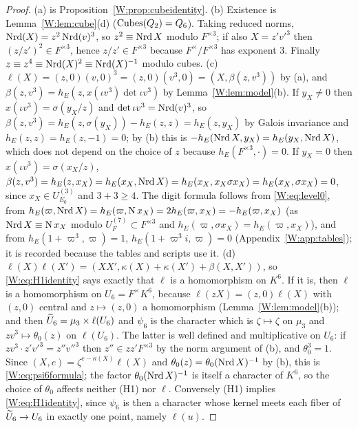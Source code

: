 \begin{proof}
(a) is Proposition~\ref{W:prop:cubeidentity}.  (b) Existence is
Lemma~\ref{W:lem:cube}(d) ($\mathrm{Cubes}(Q_2)=Q_6$).  Taking reduced norms,
$\operatorname{Nrd}(X)=z^2\operatorname{Nrd}(v)^3$, so $z^2\equiv\operatorname{Nrd} X$ modulo $F^{\times3}$; if
also $X=z'v'^3$ then $(z/z')^2\in F^{\times3}$, hence $z/z'\in F^{\times3}$
because $F^\times/F^{\times3}$ has exponent $3$.  Finally
$z\equiv z^4\equiv\operatorname{Nrd}(X)^2\equiv\operatorname{Nrd}(X)^{-1}$ modulo cubes.  (c) $\ell(X)=(z,0)(v,0)^3=(z,0)(v^3,0)=(X,\beta(z,v^3))$
by (a), and $\beta(z,v^3)=h_E(z,x(\iota v^3)\det\iota v^3)$ by
Lemma~\ref{W:lem:model}(b).  If $y_X\ne0$ then $x(\iota v^3)=\sigma(y_X/z)$
and $\det\iota v^3=\operatorname{Nrd}(v)^3$, so
$\beta(z,v^3)=h_E(z,\sigma(y_X))-h_E(z,z)=h_E(z,y_X)$ by Galois
invariance and $h_E(z,z)=h_E(z,-1)=0$; by (b) this is
$-h_E(\operatorname{Nrd} X,y_X)=h_E(y_X,\operatorname{Nrd} X)$, which does not depend on the choice
of $z$ because $h_E(F^{\times3},\cdot)=0$.  If $y_X=0$ then
$x(\iota v^3)=\sigma(x_X/z)$, $\beta(z,v^3)=h_E(z,x_X)=h_E(x_X,\operatorname{Nrd} X)=h_E(x_X,x_X\sigma x_X)=h_E(x_X,\sigma x_X)=0$,
since $x_X\in U^{(3)}_{E_0}$ and $3+3\ge4$.  The digit formula follows
from \eqref{W:eq:level0}, from $h_E(\varpi,\operatorname{Nrd} X)=h_E(\varpi,\operatorname N x_X)=2h_E(\varpi,x_X)=-h_E(\varpi,x_X)$
(as $\operatorname{Nrd} X\equiv\operatorname N x_X$ modulo $U^{(7)}_F\subset F^{\times3}$ and
$h_E(\varpi,\sigma x_X)=h_E(\varpi,x_X)$), and from $h_E(1+\varpi^3,\varpi)=1$,
$h_E(1+\varpi^3i,\varpi)=0$ (Appendix~\ref{W:app:tables}); it is recorded
because the tables and scripts use it.  (d)
$\ell(X)\ell(X')=(XX',\kappa(X)+\kappa(X')+\beta(X,X'))$, so
\eqref{W:eq:H1identity} says exactly that $\ell$ is a homomorphism on
$K^6$.  If it is, then $\ell$ is a homomorphism on $U_6=F^\times K^6$,
because $\ell(zX)=(z,0)\ell(X)$ with $(z,0)$ central and $z\mapsto(z,0)$
a homomorphism (Lemma~\ref{W:lem:model}(b)); and then
$\widetilde U_6=\mu_3\times\ell(U_6)$ and $\psi_6$ is the character which is
$\zeta\mapsto\zeta$ on $\mu_3$ and $zv^3\mapsto\theta_0(z)$ on
$\ell(U_6)$.  The latter is well defined and multiplicative on $U_6$:
if $zv^3\cdot z'v'^3=z''v''^3$ then $z''\in zz'F^{\times3}$ by the norm
argument of (b), and $\theta_0^3=1$.  Since $(X,e)=\zeta^{e-\kappa(X)}\ell(X)$
and $\theta_0(z)=\theta_0(\operatorname{Nrd} X)^{-1}$ by (b), this is
\eqref{W:eq:psi6formula}; the factor $\theta_0(\operatorname{Nrd} X)^{-1}$ is itself a
character of $K^6$, so the choice of $\theta_0$ affects neither (H1) nor
$\ell$.  Conversely (H1) implies \eqref{W:eq:H1identity}, since $\psi_6$
is then a character whose kernel meets each fiber of $\widetilde U_6\to U_6$ in
exactly one point, namely $\ell(u)$.
\end{proof}

